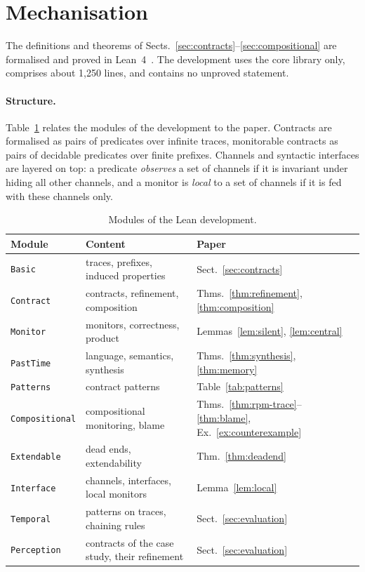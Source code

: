 \section{Mechanisation}\label{sec:mechanisation}

The definitions and theorems of Sects.~\ref{sec:contracts}--\ref{sec:compositional} are formalised and proved in Lean~4~\cite{deMouraUllrich2021}. The development uses the core library only, comprises about 1,250 lines, and contains no unproved statement.

\paragraph{Structure.}
Table~\ref{tab:lean} relates the modules of the development to the paper. Contracts are formalised as pairs of predicates over infinite traces, monitorable contracts as pairs of decidable predicates over finite prefixes. Channels and syntactic interfaces are layered on top: a predicate \emph{observes} a set of channels if it is invariant under hiding all other channels, and a monitor is \emph{local} to a set of channels if it is fed with these channels only.

\begin{table}[t]
  \caption{Modules of the Lean development.}
  \label{tab:lean}
  \centering
  \small
  \begin{tabular}{@{}lll@{}}
    \toprule
    Module & Content & Paper\\
    \midrule
    \texttt{Basic} & traces, prefixes, induced properties & Sect.~\ref{sec:contracts}\\
    \texttt{Contract} & contracts, refinement, composition & Thms.~\ref{thm:refinement}, \ref{thm:composition}\\
    \texttt{Monitor} & monitors, correctness, product & Lemmas~\ref{lem:silent}, \ref{lem:central}\\
    \texttt{PastTime} & language, semantics, synthesis & Thms.~\ref{thm:synthesis}, \ref{thm:memory}\\
    \texttt{Patterns} & contract patterns & Table~\ref{tab:patterns}\\
    \texttt{Compositional} & compositional monitoring, blame & Thms.~\ref{thm:rpm-trace}--\ref{thm:blame}, Ex.~\ref{ex:counterexample}\\
    \texttt{Extendable} & dead ends, extendability & Thm.~\ref{thm:deadend}\\
    \texttt{Interface} & channels, interfaces, local monitors & Lemma~\ref{lem:local}\\
    \texttt{Temporal} & patterns on traces, chaining rules & Sect.~\ref{sec:evaluation}\\
    \texttt{Perception} & contracts of the case study, their refinement & Sect.~\ref{sec:evaluation}\\
    \bottomrule
  \end{tabular}
\end{table}

